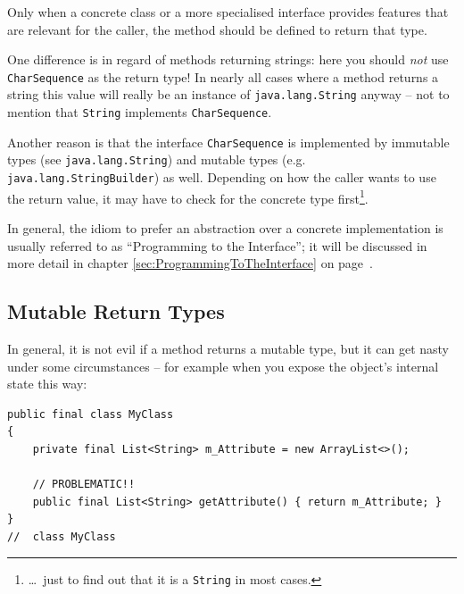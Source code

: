 \documentclass[11pt,a4paper, titlepage, parskip=half, headsepline, footsepline, cleardoublepage=current, headheight=1cm]{scrbook}
\newcommand*{\tqvref}[1]{\hyperref[{#1}]{\ref*{#1}} on page~\pageref{#1}}
\begin{document}
Only when a concrete class or a more specialised interface provides features that are relevant for the caller, the method should be defined to return that type.

One difference is in regard of methods returning strings: here you should \textit{not} use \lstinline|CharSequence| as the return type! In nearly all cases where a method returns a string this value will really be an instance of \lstinline|java.lang.String|\autocite{ORACLE_DOC_STRING_CLASS} anyway – not to mention that \lstinline|String| implements \lstinline|CharSequence|.

Another reason is that the interface \lstinline|CharSequence| is implemented by immutable types (see \lstinline|java.lang.String|) and mutable types (e.g. \lstinline|java.lang.StringBuilder|) as well. Depending on how the caller wants to use the return value, it may have to check for the concrete type first\footnote{…~just to find out that it is a \lstinline|String| in most cases.}.

In general, the idiom to prefer an abstraction over a concrete implementation is usually referred to as “Programming to the Interface”; it will be discussed in more detail in chapter \tqvref{sec:ProgrammingToTheInterface}.


\subsection{Mutable Return Types}\label{sec:MutableReturnTypes}
In general, it is not evil if a method returns a mutable type, but it can get nasty under some circumstances – for example when you expose the object's internal state this way:
\begin{lstlisting}
public final class MyClass
{
    private final List<String> m_Attribute = new ArrayList<>();

    // PROBLEMATIC!!    
    public final List<String> getAttribute() { return m_Attribute; }
}
//  class MyClass    
\end{lstlisting}
\end{document}

